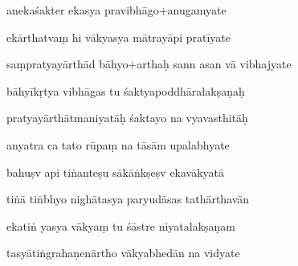 \documentclass[article,12pt,a4paper]{memoir}%
\newcounter{parCount}
\begin{document}
	  
	  \pstart {} anekaśakter ekasya pravibhāgo+anugamyate 
	{}
	\pend%
      

	  
	  \pstart \leavevmode%
	ekārthatvaṃ hi vākyasya mātrayāpi pratīyate 
	{}
	\pend%
      

	  
	  \pstart {} saṃpratyayārthād bāhyo+arthaḥ sann asan vā vibhajyate 
	{}
	\pend%
      

	  
	  \pstart \leavevmode%
	bāhyīkṛtya vibhāgas tu śaktyapoddhāralakṣaṇaḥ 
	{}
	\pend%
      

	  
	  \pstart {} pratyayārthātmaniyatāḥ śaktayo na vyavasthitāḥ 
	{}
	\pend%
      

	  
	  \pstart \leavevmode%
	anyatra ca tato rūpaṃ na tāsām upalabhyate 
	{}
	\pend%
      

	  
	  \pstart {} bahuṣv api tiṅanteṣu sākāṅkṣeṣv ekavākyatā 
	{}
	\pend%
      

	  
	  \pstart \leavevmode%
	tiṅā tiṅbhyo nighātasya paryudāsas tathārthavān 
	{}
	\pend%
      

	  
	  \pstart {} ekatiṅ yasya vākyaṃ tu śāstre niyatalakṣaṇam 
	{}
	\pend%
      

	  
	  \pstart \leavevmode%
	tasyātiṅgrahaṇenārtho vākyabhedān na vidyate 
	{}
	\pend%
      
\end{document}
